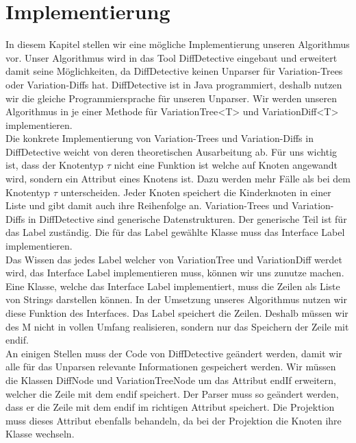 \chapter{Implementierung}

In diesem Kapitel stellen wir eine mögliche Implementierung unseren Algorithmus vor. Unser Algorithmus wird in das Tool DiffDetective eingebaut und erweitert damit seine Möglichkeiten, da DiffDetective keinen Unparser für Variation-Trees oder Variation-Diffs hat. DiffDetective ist in Java programmiert, deshalb nutzen wir die gleiche Programmiersprache für unseren Unparser. Wir werden unseren Algorithmus in je einer Methode für VariationTree<T> und VariationDiff<T> implementieren. \\

Die konkrete Implementierung von Variation-Trees und Variation-Diffs in DiffDetective weicht von deren theoretischen Ausarbeitung ab. Für uns wichtig ist, dass der Knotentyp $\tau$ nicht eine Funktion ist welche auf Knoten angewandt wird, sondern ein Attribut eines Knotens ist. Dazu werden mehr Fälle als bei dem Knotentyp $\tau$ unterscheiden. Jeder Knoten speichert die Kinderknoten in einer Liste und gibt damit auch ihre Reihenfolge an. Variation-Trees und Variation-Diffs in DiffDetective sind generische Datenstrukturen. Der generische Teil ist für das Label zuständig. Die für das Label gewählte Klasse muss das Interface Label implementieren.\\

Das Wissen das jedes Label welcher von VariationTree und VariationDiff werdet wird, das Interface Label implementieren muss, können wir uns zunutze machen. Eine Klasse, welche das Interface Label implementiert, muss die Zeilen als Liste von Strings darstellen können. In der Umsetzung unseres Algorithmus nutzen wir diese Funktion des Interfaces. Das Label speichert die Zeilen. Deshalb müssen wir des M nicht in vollen Umfang realisieren, sondern nur das Speichern der Zeile mit endif.\\


An einigen Stellen muss der Code von DiffDetective geändert werden, damit wir alle für das Unparsen relevante Informationen gespeichert werden. Wir müssen die Klassen DiffNode und VariationTreeNode um das Attribut endIf erweitern, welcher die Zeile mit dem endif speichert. Der Parser muss so geändert werden, dass er die Zeile mit dem endif im richtigen Attribut speichert. Die Projektion muss dieses Attribut ebenfalls behandeln, da bei der Projektion die Knoten ihre Klasse wechseln.\\

